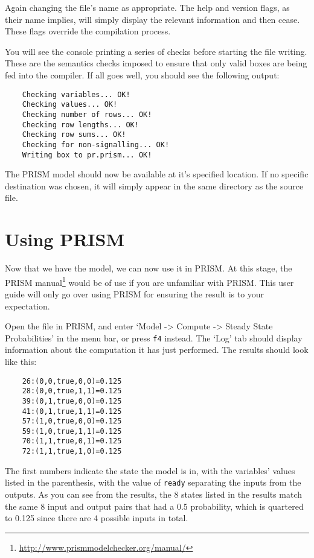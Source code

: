 \documentclass[report.tex]{subfiles}
\begin{document}
Again changing the file's name as appropriate. The help and version flags, as
their name implies, will simply display the relevant information and then cease.
These flags override the compilation process.

You will see the console printing a series of checks before starting the file
writing. These are the semantics checks imposed to ensure that only valid
boxes are being fed into the compiler. If all goes well, you should see the
following output:

\begin{lstlisting}
    Checking variables... OK!
    Checking values... OK!
    Checking number of rows... OK!
    Checking row lengths... OK!
    Checking row sums... OK!
    Checking for non-signalling... OK!
    Writing box to pr.prism... OK!
\end{lstlisting}

The PRISM model should now be available at it's specified location. If no
specific destination was chosen, it will simply appear in the same directory as
the source file.

\section{Using PRISM} %
\label{sec:using_prism}
Now that we have the model, we can now use it in PRISM. At this stage, the PRISM
manual\footnote{\url{http://www.prismmodelchecker.org/manual/}} would be of use
if you are unfamiliar with PRISM. This user guide will only go over using PRISM
for ensuring the result is to your expectation.

Open the file in PRISM, and enter `Model -> Compute -> Steady State
Probabilities' in the menu bar, or press \texttt{f4} instead. The `Log' tab
should display information about the computation it has just performed. The
results should look like this:

\begin{lstlisting}
    26:(0,0,true,0,0)=0.125
    28:(0,0,true,1,1)=0.125
    39:(0,1,true,0,0)=0.125
    41:(0,1,true,1,1)=0.125
    57:(1,0,true,0,0)=0.125
    59:(1,0,true,1,1)=0.125
    70:(1,1,true,0,1)=0.125
    72:(1,1,true,1,0)=0.125
\end{lstlisting}

The first numbers indicate the state the model is in, with the variables'
values listed in the parenthesis, with the value of \texttt{ready} separating
the inputs from the outputs. As you can see from the results, the 8 states
listed in the results match the same 8 input and output pairs that had a 0.5
probability, which is quartered to 0.125 since there are 4 possible inputs in
total.
\end{document}

